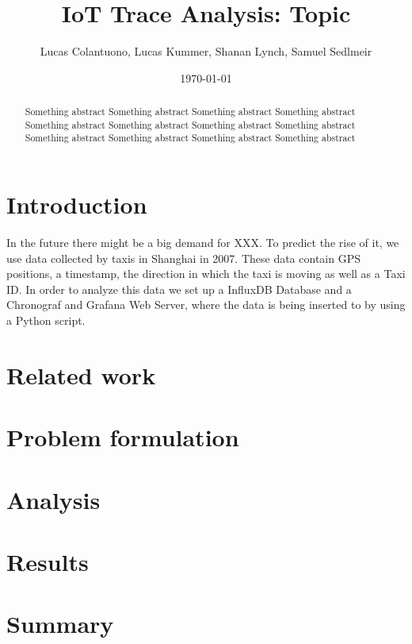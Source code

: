 \documentclass[11pt,final,a4paper,onecolumn,romanappendices]{IEEEtran}
\author{Lucas Colantuono, Lucas Kummer, Shanan Lynch, Samuel Sedlmeir}
\title{IoT Trace Analysis: Topic}
\date{\today}
\begin{document}
\maketitle

\tableofcontents
\newpage

\begin{abstract}
Something abstract Something abstract Something abstract Something abstract Something abstract Something abstract Something abstract Something abstract Something abstract Something abstract Something abstract Something abstract 
\end{abstract}

\section{Introduction}
\label{sec:Introduction}
In the future there might be a big demand for XXX. To predict the rise of it, we use data collected by taxis in Shanghai in 2007. These data contain GPS positions, a timestamp, the direction in which the taxi is moving as well as a Taxi ID. In order to analyze this data we set up a InfluxDB Database and a Chronograf and Grafana Web Server, where the data is being inserted to by using a Python script.
\section{Related work}
\section{Problem formulation}
\section{Analysis}
\section{Results}
\section{Summary}
\end{document}
